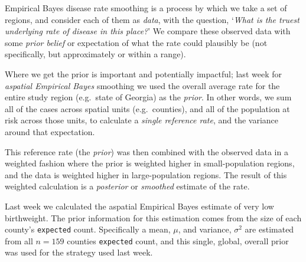 \documentclass[
]{book}
\newenvironment{Shaded}{\begin{snugshade}}{\end{snugshade}}
\newcommand{\CommentTok}[1]{\textcolor[rgb]{0.56,0.35,0.01}{\textit{#1}}}
\newcommand{\FunctionTok}[1]{\textcolor[rgb]{0.13,0.29,0.53}{\textbf{#1}}}
\newcommand{\NormalTok}[1]{#1}
\newcommand{\OtherTok}[1]{\textcolor[rgb]{0.56,0.35,0.01}{#1}}
\newcommand{\SpecialCharTok}[1]{\textcolor[rgb]{0.81,0.36,0.00}{\textbf{#1}}}
\begin{document}
Empirical Bayes disease rate smoothing is a process by which we take a set of regions, and consider each of them as \emph{data}, with the question, `\emph{What is the truest underlying rate of disease in this place?}' We compare these observed data with some \emph{prior belief} or expectation of what the rate could plausibly be (not specifically, but approximately or within a range).

Where we get the prior is important and potentially impactful; last week for \emph{aspatial Empirical Bayes} smoothing we used the overall average rate for the entire study region (e.g.~state of Georgia) as the \emph{prior}. In other words, we sum all of the cases across spatial units (e.g.~counties), and all of the population at risk across those units, to calculate a \emph{single reference rate}, and the variance around that expectation.

This reference rate (the \emph{prior}) was then combined with the observed data in a weighted fashion where the prior is weighted higher in small-population regions, and the data is weighted higher in large-population regions. The result of this weighted calculation is a \emph{posterior} or \emph{smoothed} estimate of the rate.

Last week we calculated the aspatial Empirical Bayes estimate of very low birthweight. The prior information for this estimation comes from the size of each county's \texttt{expected} count. Specifically a mean, \(\mu\), and variance, \(\sigma^2\) are estimated from all \(n=159\) counties \texttt{expected} count, and this single, global, overall prior was used for the strategy used last week.

\begin{Shaded}
\end{Shaded}
\end{document}
